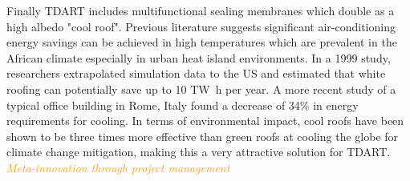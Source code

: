 \documentclass[justified]{tufte-book}
\begin{document}
\par Finally TDART includes multifunctional sealing %
membranes which double as a high albedo "cool roof". Previous literature suggests significant air-conditioning energy savings can be achieved in high temperatures which are prevalent in the African climate\cite{akbari2003measured, akbari1999cooling} especially in urban heat island environments. In a 1999 study, researchers extrapolated simulation data to the US and estimated that white roofing can potentially save up to 10 \si{{\tera\watt\hour}} per year. A more recent study\cite{pisello2013active} of a typical office building in Rome, Italy found a decrease of 34\% in energy requirements for cooling. In terms of environmental impact, cool roofs have been shown to be three times more effective than green roofs at cooling the globe for climate change mitigation\cite{sproul2014economic}, making this a very attractive solution for TDART.
	\newpage
	\textcolor{orange}{\textit{\Huge{Meta-innovation through project management}}}
	\vspace*{2cm}\\
\end{document}

